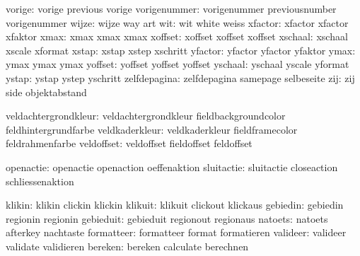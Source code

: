               vorige:  vorige               previous             vorige
        vorigenummer:  vorigenummer         previousnumber       vorigenummer
               wijze:  wijze                way                  art
                 wit:  wit                  white                weiss
             xfactor:  xfactor              xfactor              xfaktor
                xmax:  xmax                 xmax                 xmax
             xoffset:  xoffset              xoffset              xoffset
             xschaal:  xschaal              xscale               xformat
               xstap:  xstap                xstep                xschritt
             yfactor:  yfactor              yfactor              yfaktor
                ymax:  ymax                 ymax                 ymax
             yoffset:  yoffset              yoffset              yoffset
             yschaal:  yschaal              yscale               yformat
               ystap:  ystap                ystep                yschritt
        zelfdepagina:  zelfdepagina         samepage             selbeseite
                 zij:  zij                  side                 objektabstand

veldachtergrondkleur:  veldachtergrondkleur fieldbackgroundcolor feldhintergrundfarbe
      veldkaderkleur:  veldkaderkleur       fieldframecolor      feldrahmenfarbe
          veldoffset:  veldoffset           fieldoffset          feldoffset

           openactie:  openactie            openaction           oeffenaktion 
          sluitactie:  sluitactie           closeaction          schliessenaktion

              klikin:  klikin               clickin              klickin
             klikuit:  klikuit              clickout             klickaus
            gebiedin:  gebiedin             regionin             regionin
           gebieduit:  gebieduit            regionout            regionaus
             natoets:  natoets              afterkey             nachtaste
          formatteer:  formatteer           format               formatieren
            valideer:  valideer             validate             validieren
             bereken:  bereken              calculate            berechnen

\stopconstants



